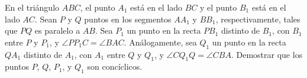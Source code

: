En el triángulo $ABC$, el punto $A_1$ está en el lado $BC$ y el punto $B_1$ está en el lado $AC$. Sean $P$ y $Q$ puntos en los segmentos $AA_1$ y $BB_1$, respectivamente, tales que $PQ$ es paralelo a $AB$. Sea $P_1$ un punto en la recta $PB_1$ distinto de $B_1$, con $B_1$ entre $P$ y $P_1$, y $\angle PP_1C = \angle BAC$. Análogamente, sea $Q_1$ un punto en la recta $QA_1$ distinto de $A_1$, con $A_1$ entre $Q$ y $Q_1$, y $\angle CQ_1Q = \angle CBA$.
Demostrar que los puntos $P$, $Q$, $P_1$, y $Q_1$ son concíclicos.